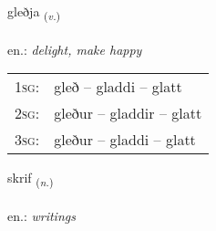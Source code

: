 \documentclass[frontgrid, backgrid]{flacards}\usepackage[]{graphicx}\usepackage[]{xcolor}
\begin{document}
\renewcommand{\blhead}{\vskip5pt {\small\bfseries\footnotesize Sagnorð | Verb }}
\renewcommand{\bcfoot}{\vskip5pt \hspace{2pt}{\small\bfseries\footnotesize 2K}}


{gleðja \small{\textsubscript{(\textit{v.})}} \\[1ex] %
\textphonetic{[klɛðja]} \\
en.: \emph{delight, make happy} \\  [2ex]
\renewcommand*{\arraystretch}{0.8}
\begin{tabular}{p{1cm}l}
\textsc{1sg}: & gleð -- gladdi -- glatt \\ 
\textsc{2sg}: & gleður -- gladdir -- glatt \\ 
\textsc{3sg}: & gleður -- gladdi -- glatt \\ 
\end{tabular}
}

\renewcommand{\flhead}{\vskip5pt \fboxsep=0pt {\small\bfseries\footnotesize Nafnorð | Noun}}
\renewcommand{\fcfoot}{\vskip5pt \fboxsep=0pt \hspace{2pt}{\small\bfseries\footnotesize 2K}}

\renewcommand{\blhead}{\vskip5pt {\small\bfseries\footnotesize Nafnorð | Noun }}
\renewcommand{\bcfoot}{\vskip5pt \hspace{2pt}{\small\bfseries\footnotesize 2K}}


{skrif \small{\textsubscript{(\textit{n.})}} \\[1ex] %
\textphonetic{[skrɪːv]} \\
en.: \emph{writings} \\  [2ex]
\renewcommand*{\arraystretch}{0.8}
}

\renewcommand{\flhead}{\vskip5pt \fboxsep=0pt {\small\bfseries\footnotesize Sagnorð | Verb}}
\renewcommand{\fcfoot}{\vskip5pt \fboxsep=0pt \hspace{2pt}{\small\bfseries\footnotesize 2K}}
\end{document}
